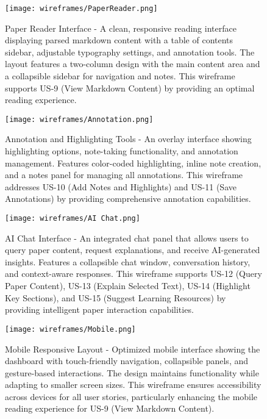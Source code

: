 \documentclass[12pt]{article}
\begin{document}
\begin{figure}[h!tbp]
  \centering
  \texttt{[image: wireframes/PaperReader.png]}
  \caption{Paper Reader Interface - A clean, responsive reading interface displaying parsed markdown content with a table of contents sidebar, adjustable typography settings, and annotation tools. The layout features a two-column design with the main content area and a collapsible sidebar for navigation and notes. This wireframe supports US-9 (View Markdown Content) by providing an optimal reading experience.}
  \label{fig:paper-reader}
\end{figure}

\begin{figure}[h!tbp]
  \centering
  \texttt{[image: wireframes/Annotation.png]}
  \caption{Annotation and Highlighting Tools - An overlay interface showing highlighting options, note-taking functionality, and annotation management. Features color-coded highlighting, inline note creation, and a notes panel for managing all annotations. This wireframe addresses US-10 (Add Notes and Highlights) and US-11 (Save Annotations) by providing comprehensive annotation capabilities.}
  \label{fig:annotation-tools}
\end{figure}

\begin{figure}[h!tbp]
  \centering
  \texttt{[image: wireframes/AI Chat.png]}
  \caption{AI Chat Interface - An integrated chat panel that allows users to query paper content, request explanations, and receive AI-generated insights. Features a collapsible chat window, conversation history, and context-aware responses. This wireframe supports US-12 (Query Paper Content), US-13 (Explain Selected Text), US-14 (Highlight Key Sections), and US-15 (Suggest Learning Resources) by providing intelligent paper interaction capabilities.}
  \label{fig:ai-chat-interface}
\end{figure}

\begin{figure}[h!tbp]
  \centering
  \texttt{[image: wireframes/Mobile.png]}
  \caption{Mobile Responsive Layout - Optimized mobile interface showing the dashboard with touch-friendly navigation, collapsible panels, and gesture-based interactions. The design maintains functionality while adapting to smaller screen sizes. This wireframe ensures accessibility across devices for all user stories, particularly enhancing the mobile reading experience for US-9 (View Markdown Content).}
  \label{fig:mobile-responsive}
\end{figure}
\end{document}
